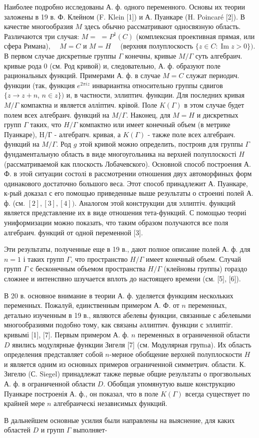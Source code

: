 \documentclass[10pt]{article}
\begin{document}
Наиболее подробно исследованы А. ф. одного переменного. Основы их теории заложены в 19 в. Ф. Клейном (F. Klein [1]) и А. Пуанкаре (H. Poincaré [2]). В качестве многообразия $M$ здесь обычно рассматривают односвязную область. Различаются три случая: $M=$ $=P^{1}(C)$ (комплексная проективная прямая, или сфера Римана), $\quad M=C$ и $M=H \quad$ (верхняя полуплоскость $\{z \in C: \operatorname{Im} z>0\})$. В первом случае дискретные группы $\Gamma$ конечны, кривые $M / \Gamma$ суть алгебраич. кривые рода 0 (см. Род кривой) и, следовательно, А. ф. образуют поле рациональных функций. Примерами А. ф. в случае $M=C$ служат периодич. функции (так, функция $e^{2 \pi i z}$ инвариантна относительно группы сдвигов $\{z \rightarrow z+n$, $n \in z\})$ и, в частности, эллиптич. функции. Для последних кривая $M / \Gamma$ компактна и является әлліптич. крівой. Поле $K(\Gamma)$ в этом случае будет полем всех алгебраич. функций на $M / \Gamma$. Наконец, для $M=H$ и дискретных групп $\Gamma$ таких, что $H / \Gamma$ компактно или имеет конечный объем (в метрике Пуанкаре), H/Г - алгебрапч. кривая, а $K(\Gamma)$ - также поле всех алгебраич. функций на $M / \Gamma$. Род $g$ этой кривой можно определить, построив для группы $\Gamma$ фундаментальную область в виде многоугольника на верхней полуплоскості $H$ (рассматриваемой как плоскость Лобачевского). Основной способ построения А. Ф. в этой ситуации состолі в рассмотрении отношения двух автоморфиных форм одинакового достаточно большого веса. Этот способ принадлежит А. Пуанкаре, к-рый доказал с его помощью приведенные выше результаты о строениі полей А. ф. (см. $[2],[3],[4])$. Аналогом этой конструкции для эллиптіч. функций является представление их в виде отношения тета-функций. С помощью теориі униформизации можно показать, что таким образом получаются все поля алгебраич. функций от одной переменной [3].



Эти результаты, полученные еще в 19 в., дают полное описание полей А. ф. для $n=1$ і таких групп $\Gamma$, что пространство $H / \Gamma$ имеет конечный объем. Случай групп $\Gamma$ с бесконечным объемом пространства $H / \Gamma$ (клейновы группы) гораздо сложнее и интенспвно шзучается вплоть до настоящего времени (см. [5], [6]).



В 20 в. основное внимание в теории А. ф. уделяется функциям нескольких переменных. Пожалуй, единственным примером А. Ф. от $n$ переменных, детально изученным в 19 в., являются абелевы функции, связанные с абелевыми многообразиями подобно тому, как связаны әллиптич. функции с эллиптіг. кривымі [1], [7]. Первым примером А. ф. $n$ переменных в ограниченной области $D$ явились модулярные функции Зигеля [7] (см. Модулярная групnа). Их область определения представляет собой $n$-мерное обобщение верхней полуплоскости $H$ и является одним из основных примеров ограниченной симметрич. области. К. Зигелю (С. Siegel) принадлежат также первые общие результаты о прогзвольных А. ф. в ограниченной области $D$. Обобщая упомянутую выше конструкцию Пуанкаре построенія А. ф., он показал, что в поле $K(\Gamma)$ всегда существует по крайней мере $n$ алгебраическі независимых функций.



В дальнейшем основные усилия были направлены на выяснение, для каких областей $D$ и групп $\Gamma$ выполняет-
\end{document}
